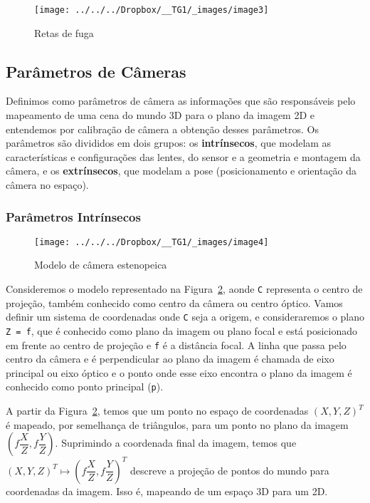 \documentclass[ecp,tc]{iiufrgs}
\begin{document}
\begin{figure}
	\centering
	\caption{Retas de fuga}
	\texttt{[image: ../../../Dropbox/\_\_TG1/\_images/image3]}
	\label{fig:image3}
\end{figure}

\subsection{Parâmetros de Câmeras}
Definimos como parâmetros de câmera as informações que são responsáveis pelo mapeamento de uma cena do mundo 3D para o plano da imagem 2D e entendemos por calibração de câmera a obtenção desses parâmetros. Os parâmetros são divididos em dois grupos: os \textbf{intrínsecos}, que modelam as características e configurações das lentes, do sensor e a geometria e montagem da câmera, e os \textbf{extrínsecos}, que modelam a pose (posicionamento e orientação da câmera no espaço).

\subsubsection{Parâmetros Intrínsecos}

\begin{figure}
	\centering
	\caption{Modelo de câmera estenopeica}
	\texttt{[image: ../../../Dropbox/\_\_TG1/\_images/image4]}
	\label{fig:image4}
\end{figure}

Consideremos o modelo representado na Figura~\ref{fig:image4}, aonde \texttt{C} representa o centro de projeção, também conhecido como centro da câmera ou centro óptico. Vamos definir um sistema de coordenadas onde \texttt{C} seja a origem, e consideraremos o plano \texttt{Z = f}, que é conhecido como plano da imagem ou plano focal e está posicionado em frente ao centro de projeção e \texttt{f} é a distância focal. A linha que passa pelo centro da câmera e é perpendicular ao plano da imagem é chamada de eixo principal ou eixo óptico e o ponto onde esse eixo encontra o plano da imagem é conhecido como ponto principal (\texttt{p}).

A partir da Figura~\ref{fig:image4}, temos que um ponto no espaço de coordenadas $(X, Y, Z)^T$ é mapeado, por semelhança de triângulos, para um ponto no plano da imagem $ (f\dfrac{X}{Z}, f\dfrac{Y}{Z}) $.
Suprimindo a coordenada final da imagem, temos que $ (X, Y, Z)^T \mapsto (f\dfrac{X}{Z}, f\dfrac{Y}{Z})^T $ descreve  a  projeção  de  pontos  do  mundo  para  coordenadas  da  imagem.  Isso  é, mapeando de um espaço 3D para um 2D.
\end{document}
